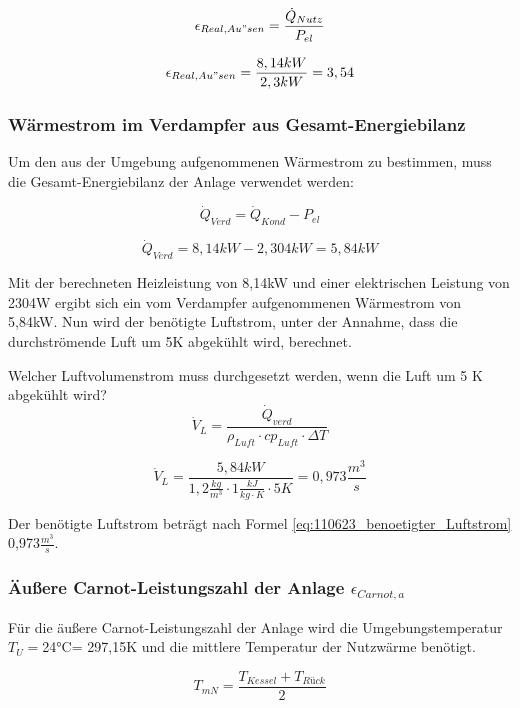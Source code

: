 \begin{equation}
\epsilon_{Real,Au"sen} = \frac{\dot Q_{Nutz}}{P_{el}}
\label{eq:110623_aeußere Leistungszahl_tatsächlich}
\end{equation}

$$ \epsilon_{Real,Au"sen} = \frac{8,14 kW}{2,3 kW} = 3,54$$

\subsubsection{Wärmestrom im Verdampfer aus Gesamt-Energiebilanz}
Um den aus der Umgebung aufgenommenen Wärmestrom zu bestimmen, muss die Gesamt-Energiebilanz der Anlage verwendet werden:

\begin{equation}
\dot Q_{Verd}=\dot Q_{Kond}-P_{el}
\label{eq:110623_aeußere Leistungszahl}
\end{equation}

$$\dot Q_{Verd}= 8,14 kW-2,304 kW= 5,84kW $$


Mit der berechneten Heizleistung von 8,14kW und einer elektrischen Leistung von 2304W ergibt sich ein vom Verdampfer aufgenommenen Wärmestrom von 5,84kW. Nun wird der benötigte Luftstrom, unter der Annahme, dass die durchströmende Luft um 5K abgekühlt wird, berechnet.

Welcher Luftvolumenstrom muss durchgesetzt werden, wenn die Luft um 5 K abgekühlt wird?
\begin{equation}
\dot V_{L}=\frac{\dot Q_{verd}}{\rho_{Luft} \cdot cp_{Luft} \cdot \Delta T}
\label{eq:110623_benoetigter_Luftstrom}
\end{equation}

$$\dot V_{L}=\frac{5,84 kW}{ 1,2 \frac{kg}{m^3} \cdot 1 \frac{kJ}{kg \cdot K} \cdot 5K}= 0,973 \frac{m^3}{s}$$


Der benötigte Luftstrom beträgt nach Formel \ref{eq:110623_benoetigter_Luftstrom} 0,973$\frac{m^3}{s}$. 
\subsubsection{Äußere Carnot-Leistungszahl der Anlage \texorpdfstring{$\epsilon_{Carnot,a}$}{}}
\label{subsubsec:Carnot}

Für die äußere Carnot-Leistungszahl der Anlage wird die Umgebungstemperatur $T_{U}=$24°C= 297,15K und die mittlere Temperatur der Nutzwärme benötigt.

\begin{equation}
T_{mN}= \frac{T_{Kessel}+T_{Rück}}{2}
\end{equation}

